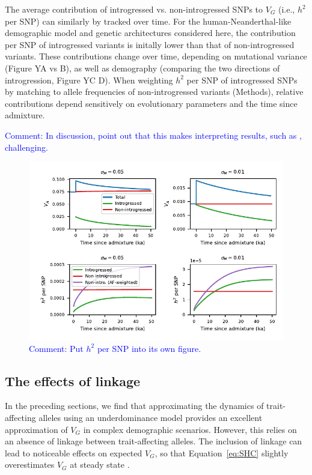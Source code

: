 \documentclass{article}
\newcommand{\aprcomment}[1]{{\textcolor{blue}{Comment: #1}}}
\begin{document}
The average contribution of introgressed vs. non-introgressed SNPs to $V_G$
(i.e., $h^2$ per SNP) can similarly by tracked over time. For the
human-Neanderthal-like demographic model and genetic architectures considered
here, the contribution per SNP of introgressed variants is initally lower than
that of non-introgressed variants. These contributions change over time,
depending on mutational variance (Figure YA vs B), as well as demography
(comparing the two directions of introgression, Figure YC D). When weighting
$h^2$ per SNP of introgressed SNPs by matching to allele frequencies of
non-introgressed variants (Methods), relative contributions depend sensitively
on evolutionary parameters and the time since admixture.

\aprcomment{In discussion, point out that this makes interpreting results, such
as \cite{wei2023lingering}, challenging.}

\begin{figure}[t!]
    \centering
    \includegraphics{../figures/human_admixture.pdf}
    \caption{
        \textbf{}
        \aprcomment{Put $h^2$ per SNP into its own figure.}
    }
    \label{fig:human-to-neand}
\end{figure}

\subsection*{The effects of linkage}

In the preceding sections, we find that approximating the dynamics of
trait-affecting alleles using an underdominance model
\citep{robertson1956effect} provides an excellent approximation of $V_G$ in
complex demographic scenarios. However, this relies on an absence of linkage
between trait-affecting alleles. The inclusion of linkage can lead to
noticeable effects on expected $V_G$, so that Equation~\ref{eq:SHC} slightly
overestimates $V_G$ at steady state
\citep{burger1989much,burger1994distribution,walsh2018evolution}.
\end{document}
